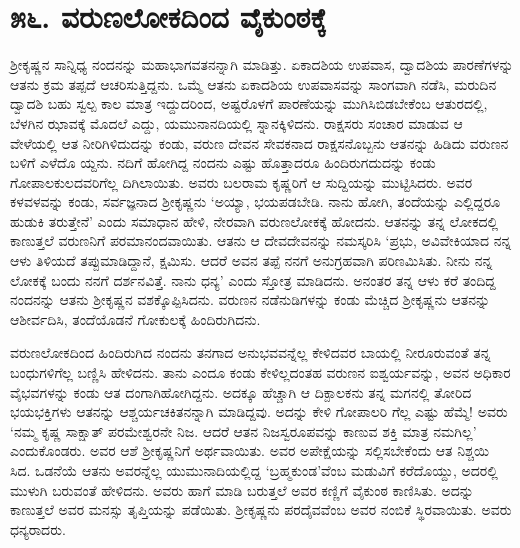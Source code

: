 
\chapter{೫೬. ವರುಣಲೋಕದಿಂದ ವೈಕುಂಠಕ್ಕೆ}

ಶ್ರೀಕೃಷ್ಣನ ಸಾನ್ನಿಧ್ಯ ನಂದನನ್ನು ಮಹಾಭಾಗವತನನ್ನಾಗಿ ಮಾಡಿತ್ತು. ಏಕಾದಶಿಯ ಉಪವಾಸ, ದ್ವಾದಶಿಯ ಪಾರಣೆಗಳನ್ನು ಆತನು ಕ್ರಮ ತಪ್ಪದೆ ಆಚರಿಸುತ್ತಿದ್ದನು. ಒಮ್ಮೆ ಆತನು ಏಕಾದಶಿಯ ಉಪವಾಸವನ್ನು ಸಾಂಗವಾಗಿ ನಡೆಸಿ, ಮರುದಿನ ದ್ವಾದಶಿ ಬಹು ಸ್ವಲ್ಪ ಕಾಲ ಮಾತ್ರ ಇದ್ದುದರಿಂದ, ಅಷ್ಟರೊಳಗೆ ಪಾರಣೆಯನ್ನು ಮುಗಿಸಿಬಿಡಬೇಕೆಂಬ ಆತುರದಲ್ಲಿ, ಬೆಳಗಿನ ಝಾವಕ್ಕೆ ಮೊದಲೆ ಎದ್ದು, ಯಮುನಾನದಿಯಲ್ಲಿ ಸ್ನಾನಕ್ಕಿಳಿದನು. ರಾಕ್ಷಸರು ಸಂಚಾರ ಮಾಡುವ ಆ ವೇಳೆಯಲ್ಲಿ ಆತ ನೀರಿಗಿಳಿದುದನ್ನು ಕಂಡು, ವರುಣ ದೇವನ ಸೇವಕನಾದ ರಾಕ್ಷಸನೊಬ್ಬನು ಆತನನ್ನು ಹಿಡಿದು ವರುಣನ ಬಳಿಗೆ ಎಳೆದೊ ಯ್ದನು. ನದಿಗೆ ಹೋಗಿದ್ದ ನಂದನು ಎಷ್ಟು ಹೊತ್ತಾದರೂ ಹಿಂದಿರುಗದುದನ್ನು ಕಂಡು ಗೋಪಾಲಕುಲದವರಿಗೆಲ್ಲ ದಿಗಿಲಾಯಿತು. ಅವರು ಬಲರಾಮ ಕೃಷ್ಣರಿಗೆ ಆ ಸುದ್ದಿಯನ್ನು ಮುಟ್ಟಿಸಿದರು. ಅವರ ಕಳವಳವನ್ನು ಕಂಡು, ಸರ್ವಜ್ಞನಾದ ಶ್ರೀಕೃಷ್ಣನು ‘ಅಯ್ಯಾ, ಭಯಪಡಬೇಡಿ. ನಾನು ಹೋಗಿ, ತಂದೆಯನ್ನು ಎಲ್ಲಿದ್ದರೂ ಹುಡುಕಿ ತರುತ್ತೇನೆ’ ಎಂದು ಸಮಾಧಾನ ಹೇಳಿ, ನೇರವಾಗಿ ವರುಣಲೋಕಕ್ಕೆ ಹೋದನು. ಆತನನ್ನು ತನ್ನ ಲೋಕದಲ್ಲಿ ಕಾಣುತ್ತಲೆ ವರುಣನಿಗೆ ಪರಮಾನಂದವಾಯಿತು. ಆತನು ಆ ದೇವದೇವನನ್ನು ನಮಸ್ಕರಿಸಿ ‘ಪ್ರಭು, ಅವಿವೇಕಿಯಾದ ನನ್ನ ಆಳು ತಿಳಿಯದೆ ತಪ್ಪುಮಾಡಿದ್ದಾನೆ, ಕ್ಷಮಿಸು. ಆದರೆ ಅವನ ತಪ್ಪೆ ನನಗೆ ಅನುಗ್ರಹವಾಗಿ ಪರಿಣಮಿಸಿತು. ನೀನು ನನ್ನ ಲೋಕಕ್ಕೆ ಬಂದು ನನಗೆ ದರ್ಶನವಿತ್ತೆ. ನಾನು ಧನ್ಯ’ ಎಂದು ಸ್ತೋತ್ರ ಮಾಡಿದನು. ಅನಂತರ ತನ್ನ ಆಳು ಕರೆ ತಂದಿದ್ದ ನಂದನನ್ನು ಆತನು ಶ್ರೀಕೃಷ್ಣನ ವಶಕ್ಕೊಪ್ಪಿಸಿದನು. ವರುಣನ ನಡೆನುಡಿಗಳನ್ನು ಕಂಡು ಮೆಚ್ಚಿದ ಶ್ರೀಕೃಷ್ಣನು ಆತನನ್ನು ಆಶೀರ್ವದಿಸಿ, ತಂದೆಯೊಡನೆ ಗೋಕುಲಕ್ಕೆ ಹಿಂದಿರುಗಿದನು.

ವರುಣಲೋಕದಿಂದ ಹಿಂದಿರುಗಿದ ನಂದನು ತನಗಾದ ಅನುಭವವನ್ನೆಲ್ಲ ಕೇಳಿದವರ ಬಾಯಲ್ಲಿ ನೀರೂರುವಂತೆ ತನ್ನ ಬಂಧುಗಳಿಗೆಲ್ಲ ಬಣ್ಣಿಸಿ ಹೇಳಿದನು. ತಾನು ಎಂದೂ ಕಂಡು ಕೇಳಿಲ್ಲದಂತಹ ವರುಣನ ಐಶ್ವರ್ಯವನ್ನು, ಅವನ ಅಧಿಕಾರ ವೈಭವಗಳನ್ನು ಕಂಡು ಆತ ದಂಗಾಗಿಹೋಗಿದ್ದನು. ಅದಕ್ಕೂ ಹೆಚ್ಚಾಗಿ ಆ ದಿಕ್ಪಾಲಕನು ತನ್ನ ಮಗನಲ್ಲಿ ತೋರಿದ ಭಯಭಕ್ತಿಗಳು ಆತನನ್ನು ಆಶ್ಚರ್ಯಚಕಿತನನ್ನಾಗಿ ಮಾಡಿದ್ದವು. ಅದನ್ನು ಕೇಳಿ ಗೋಪಾಲರಿ ಗೆಲ್ಲ ಎಷ್ಟು ಹೆಮ್ಮೆ! ಅವರು ‘ನಮ್ಮ ಕೃಷ್ಣ ಸಾಕ್ಷಾತ್ ಪರಮೇಶ್ವರನೇ ನಿಜ. ಆದರೆ ಆತನ ನಿಜಸ್ವರೂಪವನ್ನು ಕಾಣುವ ಶಕ್ತಿ ಮಾತ್ರ ನಮಗಿಲ್ಲ’ ಎಂದುಕೊಂಡರು. ಅವರ ಆಶೆ ಶ್ರೀಕೃಷ್ಣನಿಗೆ ಅರ್ಥವಾಯಿತು. ಅವರ ಅಪೇಕ್ಷೆಯನ್ನು ಸಲ್ಲಿಸಬೇಕೆಂದು ಆತ ನಿಶ್ಚಯಿ ಸಿದ. ಒಡನೆಯೆ ಆತನು ಅವರನ್ನೆಲ್ಲ ಯುಮುನಾದಿಯಲ್ಲಿದ್ದ ‘ಬ್ರಹ್ಮಕುಂಡ’ವೆಂಬ ಮಡುವಿಗೆ ಕರೆದೊಯ್ದು, ಅದರಲ್ಲಿ ಮುಳುಗಿ ಬರುವಂತೆ ಹೇಳಿದನು. ಅವರು ಹಾಗೆ ಮಾಡಿ ಬರುತ್ತಲೆ ಅವರ ಕಣ್ಣಿಗೆ ವೈಕುಂಠ ಕಾಣಿಸಿತು. ಅದನ್ನು ಕಾಣುತ್ತಲೆ ಅವರ ಮನಸ್ಸು ತೃಪ್ತಿಯನ್ನು ಪಡೆಯಿತು. ಶ್ರೀಕೃಷ್ಣನು ಪರದೈವವೆಂಬ ಅವರ ನಂಬಿಕೆ ಸ್ಥಿರವಾಯಿತು. ಅವರು ಧನ್ಯರಾದರು.

